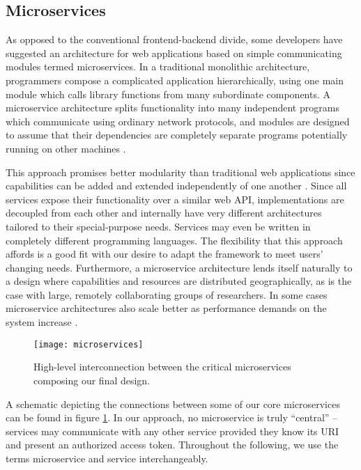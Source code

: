 \documentclass[../thesis]{subfiles}
\begin{document}
\subsection{Microservices}
As opposed to the conventional \gls{frontend}-\gls{backend} divide, some
developers have suggested an architecture for web applications based
on simple communicating modules termed \glspl{microservice}. In a
traditional monolithic architecture, programmers compose a complicated
application hierarchically, using one main module which calls library
functions from many subordinate components.  A microservice
architecture splits functionality into many independent programs which
communicate using ordinary network protocols, and modules are designed
to assume that their dependencies are completely separate programs
potentially running on other machines \cite{Micro14:online}.

This approach promises better modularity than traditional web
applications since capabilities can be added and extended
independently of one another \cite{Balalaie2016}. Since all services
expose their functionality over a similar web \gls{API},
implementations are decoupled from each other and internally have very
different architectures tailored to their special-purpose needs.
Services may even be written in completely different programming
languages. The flexibility that this approach affords is a good fit
with our desire to adapt the framework to meet users' changing
needs. Furthermore, a microservice architecture lends itself naturally
to a design where capabilities and resources are distributed
geographically, as is the case with large, remotely collaborating
groups of researchers. In some cases microservice architectures also
scale better as performance demands on the system increase
\cite{wolff2016microservices}.

\begin{figure}
  \texttt{[image: microservices]}
  \caption{
    High-level interconnection between the critical microservices
    composing our final design.
    \label{fig:Microservices}
  }
\end{figure}

A schematic depicting the connections between some of our core
microservices can be found in figure \ref{fig:Microservices}.
In our approach, no microservice is truly ``central'' -- services may
communicate with any other service provided they know its URI and
present an authorized access token.
Throughout the following, we use the terms microservice and service
interchangeably.
\end{document}
